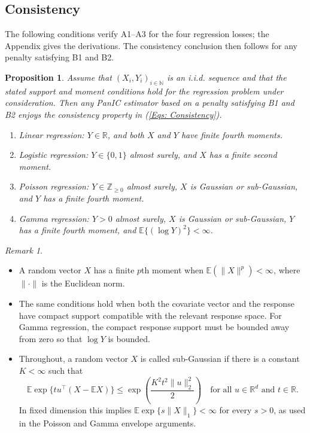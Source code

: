 \documentclass[12pt]{article}
\newtheorem{proposition}{Proposition}
\theoremstyle{remark}
\newtheorem{remark}{Remark}
\theoremstyle{plain}
\begin{document}
\subsection{Consistency} \label{Sect: Theory}
The following conditions verify A1--A3 for the four regression losses; the Appendix gives the derivations. The consistency conclusion then follows for any penalty satisfying B1 and B2.
\begin{proposition}\label{Prop: Sufficient conditions}
Assume that $(X_i,Y_i)_{i\in\mathbb N}$ is an i.i.d. sequence and that the stated support and moment conditions hold for the regression problem under consideration. Then any PanIC estimator based on a penalty satisfying B1 and B2 enjoys the consistency property in (\ref{Eqs: Consistency}).
    \begin{enumerate}
        \item[1.] Linear regression: $Y\in\mathbb R$, and both $X$ and $Y$ have finite fourth moments.
        \item[2.] Logistic regression: $Y\in\{0,1\}$ almost surely, and $X$ has a finite second moment.
        \item[3.] Poisson regression: $Y\in\mathbb Z_{\geq0}$ almost surely, $X$ is Gaussian or sub-Gaussian, and $Y$ has a finite fourth moment.
        \item[4.] Gamma regression: $Y>0$ almost surely, $X$ is Gaussian or sub-Gaussian, $Y$ has a finite fourth moment, and $\mathbb E\{(\log Y)^2\}<\infty$.
    \end{enumerate}
\end{proposition}
\begin{remark}
\begin{itemize}
    \item[i)] A random vector $X$ has a finite $p$th moment when $\mathbb E(\lVert X\rVert^p)<\infty$, where $\lVert\cdot\rVert$ is the Euclidean norm.
    \item[ii)] The same conditions hold when both the covariate vector and the response have compact support compatible with the relevant response space. For Gamma regression, the compact response support must be bounded away from zero so that $\log Y$ is bounded.
    \item[iii)] Throughout, a random vector $X$ is called sub-Gaussian if there is a constant $K<\infty$ such that
    \[
    \mathbb E\exp\{t u^\top(X-\mathbb EX)\}
    \le \exp\left(\frac{K^2t^2\|u\|_2^2}{2}\right)
    \quad\text{for all }u\in\mathbb R^d\text{ and }t\in\mathbb R.
    \]
    In fixed dimension this implies $\mathbb E\exp\{s\|X\|_1\}<\infty$ for every $s>0$, as used in the Poisson and Gamma envelope arguments.
\end{itemize}
\end{remark}
\end{document}
